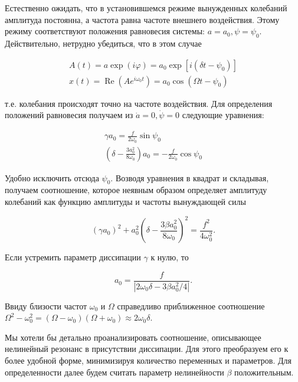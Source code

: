 \documentclass[11pt]{article}
\begin{document}
    Естественно ожидать, что в установившемся режиме вынужденных колебаний
амплитуда постоянна, а частота равна частоте внешнего воздействия. Этому
режиму соответствуют положения равновесия системы:
\(a = a_0, \psi = \psi_0\). Действительно, нетрудно убедиться, что в
этом случае

\begin{equation}
\begin{array}{c}
A(t)=a \exp (i \varphi)=a_{0} \exp \left[i\left(\delta t-\psi_{0}\right)\right] \\
x(t)=\operatorname{Re}\left(A e^{i \omega_{0} t}\right)=a_{0} \cos \left(\Omega t-\psi_{0}\right)
\end{array}
\end{equation}

т.е. колебания происходят точно на частоте воздействия. Для определения
положений равновесия получаем из \(\dot{a} =0, \dot{\psi} = 0\)
следующие уравнения:

\begin{equation}
\begin{array}{c}
\gamma a_{0}=\frac{f}{2 \omega_{0}} \sin \psi_{0} \\
\left(\delta-\frac{3 a_{0}^{2}}{8 \omega_{0}}\right) a_{0}=-\frac{f}{2 \omega_{0}} \cos \psi_{0}
\end{array}
\end{equation}

Удобно исключить отсюда \(\psi_0\). Возводя уравнения в квадрат и
складывая, получаем соотношение, которое неявным образом определяет
амплитуду колебаний как функцию амплитуды и частоты вынуждающей силы

\begin{equation}
\left(\gamma a_{0}\right)^{2}+a_{0}^{2}\left(\delta-\frac{3 \beta a_{0}^{2}}{8 \omega_{0}}\right)^{2}=\frac{f^{2}}{4 \omega_{0}^{2}}.
\end{equation}

Если устремить параметр диссипации \(\gamma\) к нулю, то

\begin{equation}
a_{0}=\frac{f}{\left|2 \omega_{0} \delta-3 \beta a_{0}^{2} / 4\right|}.
\end{equation}

Ввиду близости частот \(\omega_0\) и \(\Omega\) справедливо приближенное
соотношение
\(\Omega^2 - \omega_0^2 = (\Omega - \omega_0) (\Omega + \omega_0) \approx 2 \omega_0 \delta\).

Мы хотели бы детально проанализировать соотношение, описывающее
нелинейный резонанс в присутствии диссипации. Для этого преобразуем его
к более удобной форме, минимизируя количество переменных и параметров.
Для определенности далее будем считать параметр нелинейности \(\beta\)
положительным.
\end{document}
